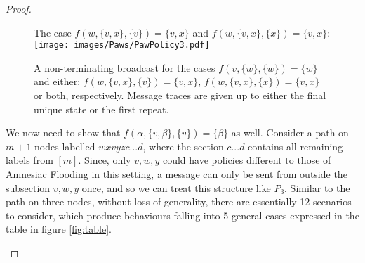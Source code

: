 \begin{proof}
\begin{figure}
    \centering
        The case $f(w,\{v,x\},\{v\})=\{v,x\}$ and $f(w,\{v,x\},\{x\})=\{v,x\}$:\\ \texttt{[image: images/Paws/PawPolicy3.pdf]}\\
        \caption{A non-terminating broadcast for the cases $f(v,\{w\},\{w\})=\{w\}$ and either: $f(w,\{v,x\},\{v\})=\{v,x\}$, $f(w,\{v,x\},\{x\})=\{v,x\}$ or both, respectively. Message traces are given up to either the final unique state or the first repeat.}
        \label{fig:Paw Non-Termination}
    \end{figure}
    We now need to show that $f(\alpha,\{v,\beta\},\{v\})=\{\beta\}$ as well. Consider a path on $m+1$ nodes labelled $wxvyzc...d$, where the section $c...d$ contains all remaining labels from $[m]$. Since, only $v,w,y$ could have policies different to those of Amnesiac Flooding in this setting, a message can only be sent from outside the subsection $v,w,y$ once, and so we can treat this structure like $P_3$. Similar to the path on three nodes, without loss of generality, there are essentially 12 scenarios to consider, which produce behaviours falling into 5 general cases expressed in the table in figure \ref{fig:table}.
    \begin{figure}
        \centering
\end{figure}
\end{proof}
